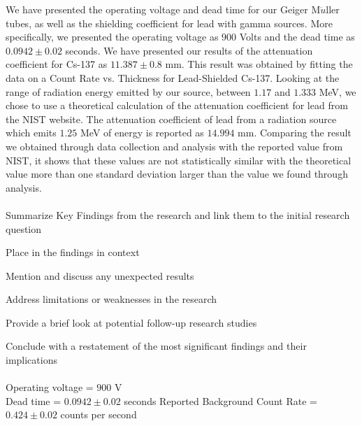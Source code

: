 We have presented the operating voltage and dead time for our Geiger M$\ddot{u}$ller tubes, as well as the shielding coefficient for lead with gamma sources. More specifically, we presented the operating voltage as $900$ Volts and the dead time as $0.0942 \pm 0.02$ seconds. We have presented our results of the attenuation coefficient for Cs-137 as $11.387 \pm 0.8$ mm. This result was obtained by fitting the data on a Count Rate vs. Thickness for Lead-Shielded Cs-137. Looking at the range of radiation energy emitted by our source, between $1.17$ and $1.333$ MeV, we chose to use a theoretical calculation of the attenuation coefficient for lead from the NIST website. The attenuation coefficient of lead from a radiation source which emits $1.25$ MeV of energy is reported as $14.994$ mm. Comparing the result we obtained through data collection and analysis with the reported value from NIST, it shows that these values are not statistically similar with the theoretical value more than one standard deviation larger than the value we found through analysis.
\\ \\
Summarize Key Findings from the research and link them to the initial research question

Place in the findings in context

Mention and discuss any unexpected results

Address limitations or weaknesses in the research

Provide a brief look at potential follow-up research studies

Conclude with a restatement of the most significant findings and their implications
\\ \\
Operating voltage = $900$ V \\
Dead time = $0.0942 \pm 0.02$ seconds
Reported Background Count Rate  = $0.424 \pm 0.02$ counts per second \\ 